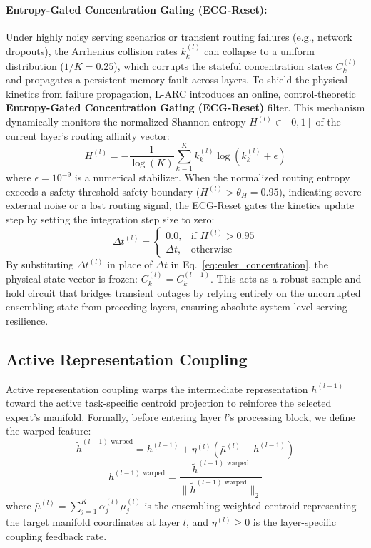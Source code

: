 \paragraph{Entropy-Gated Concentration Gating (ECG-Reset):}
Under highly noisy serving scenarios or transient routing failures (e.g., network dropouts), the Arrhenius collision rates $k_k^{(l)}$ can collapse to a uniform distribution ($1/K = 0.25$), which corrupts the stateful concentration states $C_k^{(l)}$ and propagates a persistent memory fault across layers. To shield the physical kinetics from failure propagation, L-ARC introduces an online, control-theoretic \textbf{Entropy-Gated Concentration Gating (ECG-Reset)} filter. This mechanism dynamically monitors the normalized Shannon entropy $H^{(l)} \in [0, 1]$ of the current layer's routing affinity vector:
\begin{equation}
H^{(l)} = - \frac{1}{\log(K)} \sum_{k=1}^K k_k^{(l)} \log\left(k_k^{(l)} + \epsilon\right)
\label{eq:routing_entropy}
\end{equation}
where $\epsilon = 10^{-9}$ is a numerical stabilizer. When the normalized routing entropy exceeds a safety threshold safety boundary ($H^{(l)} > \theta_H = 0.95$), indicating severe external noise or a lost routing signal, the ECG-Reset gates the kinetics update step by setting the integration step size to zero:
\begin{equation}
\Delta t^{(l)} = \begin{cases}
0.0, & \text{if } H^{(l)} > 0.95 \\
\Delta t, & \text{otherwise}
\end{cases}
\label{eq:entropy_gating_rule}
\end{equation}
By substituting $\Delta t^{(l)}$ in place of $\Delta t$ in Eq.~\ref{eq:euler_concentration}, the physical state vector is frozen: $C_k^{(l)} = C_k^{(l-1)}$. This acts as a robust sample-and-hold circuit that bridges transient outages by relying entirely on the uncorrupted ensembling state from preceding layers, ensuring absolute system-level serving resilience.

\subsection{Active Representation Coupling}
Active representation coupling warps the intermediate representation $h^{(l-1)}$ toward the active task-specific centroid projection to reinforce the selected expert's manifold. Formally, before entering layer $l$'s processing block, we define the warped feature:
\begin{equation}
\tilde{h}^{(l-1) \text{ warped}} = h^{(l-1)} + \eta^{(l)} \left( \bar{\mu}^{(l)} - h^{(l-1)} \right)
\label{eq:warped_raw}
\end{equation}
\begin{equation}
h^{(l-1) \text{ warped}} = \frac{\tilde{h}^{(l-1) \text{ warped}}}{\|\tilde{h}^{(l-1) \text{ warped}}\|_2}
\label{eq:warped_norm}
\end{equation}
where $\bar{\mu}^{(l)} = \sum_{j=1}^K \alpha_j^{(l)} \mu_j^{(l)}$ is the ensembling-weighted centroid representing the target manifold coordinates at layer $l$, and $\eta^{(l)} \ge 0$ is the layer-specific coupling feedback rate.

